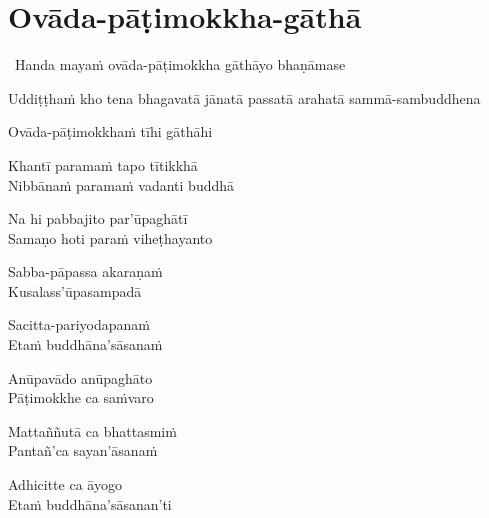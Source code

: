 
\section{Ovāda-pāṭimokkha-gāthā}
\label{ovada-patimokkha-gatha}

\begin{intro}
	\anglebracketleft\ \hspace{-0.5mm}Handa mayaṁ ovāda-pāṭimokkha gāthāyo bhaṇāmase \hspace{-0.5mm}\anglebracketright\
\end{intro}

\medskip

\begin{pali-hang}
Uddiṭṭhaṁ kho tena bhagavatā jānatā passatā arahatā sammā-sambuddhena
\end{pali-hang}
Ovāda-pāṭimokkhaṁ tīhi gāthāhi
\begin{pali-hang}
Khantī paramaṁ tapo tītikkhā\\
Nibbānaṁ paramaṁ vadanti buddhā
\end{pali-hang}
\begin{pali-hang}
Na hi pabbajito par'ūpaghātī\\
Samaṇo hoti paraṁ viheṭhayanto
\end{pali-hang}
\begin{pali-hang}
Sabba-pāpassa akaraṇaṁ\\
Kusalass'ūpasampadā
\end{pali-hang}
\begin{pali-hang}
Sacitta-pariyodapanaṁ\\
Etaṁ buddhāna'sāsanaṁ
\end{pali-hang}
\begin{pali-hang}
Anūpavādo anūpaghāto\\
Pāṭimokkhe ca saṁvaro
\end{pali-hang}
\begin{pali-hang}
Mattaññutā ca bhattasmiṁ\\
Pantañ'ca sayan'āsanaṁ
\end{pali-hang}
\begin{pali-hang}
Adhicitte ca āyogo\\
Etaṁ buddhāna'sāsanan'ti
\end{pali-hang}

\clearpage

